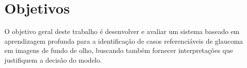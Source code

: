 \documentclass[12pt]{article}
\begin{document}

\bigskip

\section{Objetivos}
\label{sec:objetivo}

O objetivo geral deste trabalho é desenvolver e avaliar um sistema baseado em aprendizagem profunda para a identificação de casos referenciáveis de glaucoma em imagens de fundo de olho, buscando também fornecer interpretações que justifiquem a decisão do modelo.
\end{document}
